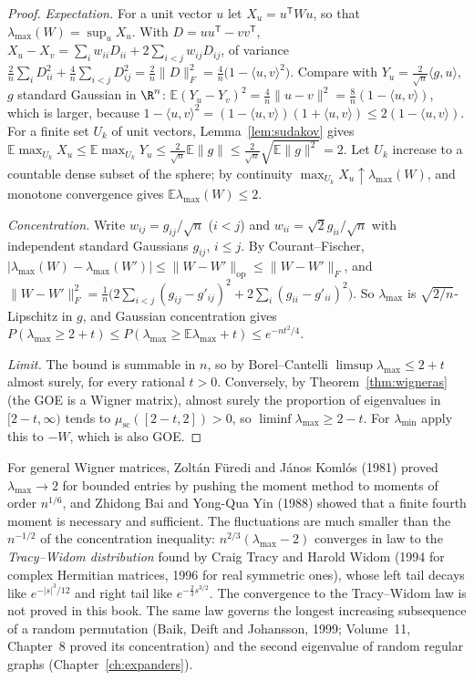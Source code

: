 \begin{proof}
\emph{Expectation.} For a unit vector $u$ let $X_u=u^{\mathsf T}Wu$, so that $\lambda_{\max}(W)=\sup_uX_u$. With $D=uu^{\mathsf T}-vv^{\mathsf T}$, $X_u-X_v=\sum_iw_{ii}D_{ii}+2\sum_{i<j}w_{ij}D_{ij}$, of variance
$\frac2n\sum_iD_{ii}^2+\frac4n\sum_{i<j}D_{ij}^2=\frac2n\|D\|_F^2=\frac4n\bigl(1-\langle u,v\rangle^2\bigr)$. Compare with $Y_u=\frac2{\sqrt n}\langle g,u\rangle$, $g$ standard Gaussian in $\R^n$:
$\mathbb E(Y_u-Y_v)^2=\frac4n\|u-v\|^2=\frac8n(1-\langle u,v\rangle)$, which is larger, because $1-\langle u,v\rangle^2=(1-\langle u,v\rangle)(1+\langle u,v\rangle)\le2(1-\langle u,v\rangle)$. For a finite set $U_k$ of unit vectors,
Lemma~\ref{lem:sudakov} gives $\mathbb E\max_{U_k}X_u\le\mathbb E\max_{U_k}Y_u\le\frac2{\sqrt n}\mathbb E\|g\|\le\frac2{\sqrt n}\sqrt{\mathbb E\|g\|^2}=2$. Let $U_k$ increase to a countable dense subset of the sphere; by continuity
$\max_{U_k}X_u\uparrow\lambda_{\max}(W)$, and monotone convergence gives $\mathbb E\lambda_{\max}(W)\le2$.

\emph{Concentration.} Write $w_{ij}=g_{ij}/\sqrt n$ ($i<j$) and $w_{ii}=\sqrt2g_{ii}/\sqrt n$ with independent standard Gaussians $g_{ij}$, $i\le j$. By Courant--Fischer, $|\lambda_{\max}(W)-\lambda_{\max}(W')|\le\|W-W'\|_{\mathrm{op}}\le\|W-W'\|_F$, and
$\|W-W'\|_F^2=\frac1n\bigl(2\sum_{i<j}(g_{ij}-g'_{ij})^2+2\sum_i(g_{ii}-g'_{ii})^2\bigr)$. So $\lambda_{\max}$ is $\sqrt{2/n}$-Lipschitz in $g$, and Gaussian concentration gives $P(\lambda_{\max}\ge2+t)\le P(\lambda_{\max}\ge\mathbb E\lambda_{\max}+t)\le e^{-nt^2/4}$.

\emph{Limit.} The bound is summable in $n$, so by Borel--Cantelli $\limsup\lambda_{\max}\le2+t$ almost surely, for every rational $t>0$. Conversely, by Theorem~\ref{thm:wigneras} (the GOE is a Wigner matrix), almost surely the
proportion of eigenvalues in $[2-t,\infty)$ tends to $\mu_{\mathrm{sc}}([2-t,2])>0$, so $\liminf\lambda_{\max}\ge2-t$. For $\lambda_{\min}$ apply this to $-W$, which is also GOE.
\end{proof}

\begin{remark}
For general Wigner matrices, Zolt\'an F\"uredi and J\'anos Koml\'os (1981) proved $\lambda_{\max}\to2$ for bounded entries by pushing the moment method to moments of order $n^{1/6}$, and Zhidong Bai and Yong-Qua Yin (1988) showed that a
finite fourth moment is necessary and sufficient. The fluctuations are much smaller than the $n^{-1/2}$ of the concentration inequality: $n^{2/3}(\lambda_{\max}-2)$ converges in law to the \emph{Tracy--Widom distribution} found by
Craig Tracy and Harold Widom (1994 for complex Hermitian matrices, 1996 for real symmetric ones), whose left tail decays like $e^{-|s|^3/12}$ and right tail like $e^{-\frac23s^{3/2}}$. The convergence to the Tracy--Widom law is not proved in this book. The same law governs the longest
increasing subsequence of a random permutation (Baik, Deift and Johansson, 1999; Volume~11, Chapter~8 proved its concentration) and the second eigenvalue of random regular graphs (Chapter~\ref{ch:expanders}).
\end{remark}

